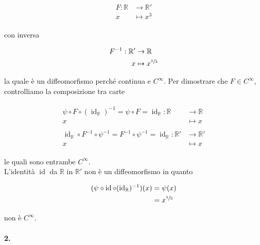 \begin{align}
	\begin{split}
		F : \mathbb{R} &\to \mathbb{R}'\\
		x &\mapsto x^{3}
	\end{split}	
\end{align}

con inversa

\begin{align}
	\begin{split}
		F^{-1} : \mathbb{R}' &\to \mathbb{R}\\
		x &\mapsto x^{\sfrac{1}{3}}
	\end{split}	
\end{align}

la quale è un diffeomorfismo perché continua e $ C^{\infty} $. Per dimostrare che $ F \in C^{\infty} $, controlliamo la composizione tra carte

\begin{align}
	\begin{split}
		\psi \circ F \circ (\operatorname{id}_{\mathbb{R}})^{-1} = \psi \circ F = \operatorname{id}_{\mathbb{R}} : \mathbb{R} &\to \mathbb{R}\\
		x &\mapsto x\\\\
		\operatorname{id}_{\mathbb{R}} \circ F^{-1} \circ \psi^{-1} = F^{-1} \circ \psi^{-1} = \operatorname{id}_{\mathbb{R}} : \mathbb{R}' &\to \mathbb{R}'\\
		x &\mapsto x
	\end{split}	
\end{align}

le quali sono entrambe $ C^{\infty} $.\\
L'identità $ \operatorname{id} $ da $ \mathbb{R} $ in $ \mathbb{R}' $ non è un diffeomorfismo in quanto

\begin{align}
	\begin{split}
		(\psi \circ \operatorname{id} \circ (\operatorname{id}_{\mathbb{R}})^{-1})(x) &= \psi(x)\\
		&= x^{\sfrac{1}{3}}
	\end{split}
\end{align}

non è $ C^{\infty} $.

\paragraph{2.}

